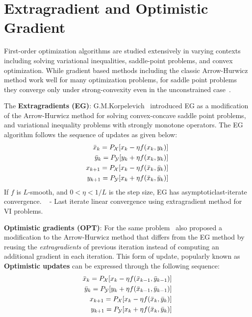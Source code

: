 \section{Extragradient and Optimistic Gradient}
First-order optimization algorithms are studied extensively in varying contexts including solving
variational inequalities, saddle-point problems, and convex optimization.
While gradient based methods including the classic Arrow-Hurwicz method work well for many
optimization problems, for saddle point problems they converge only under strong-convexity even in
the unconstrained case~\cite{heConvergence2022}.

The \textbf{Extragradients (EG)}: G.M.Korpelevich~\cite{korpelevichextragradient1976} introduced EG
as a modification of the Arrow-Hurwicz method for solving convex-concave saddle point problems, and
variational inequality problems with strongly monotone operators.
The EG algorithm follows the sequence of updates as given below:
\begin{equation}
	\label{eqn:eg}
	\begin{split}
		\bar{x}_{k} = P_{\mathcal{X}}[x_k - \eta f(x_k, y_k)] \\ \bar{y}_{k} = P_{\mathcal{Y}}[y_k + \eta
				f(x_k, y_k)] \\ x_{k+1} = P_{\mathcal{X}}[x_k - \eta f(\bar{x}_k, \bar{y}_k)] \\ y_{k+1} = P_{\mathcal{Y}}[x_k
				+ \eta f(\bar{x}_k, \bar{y}_k)]
	\end{split}
\end{equation} If $f$ is $L$-smooth, and $0 < \eta <
	1/L$ is the step size, EG has asymptoticlast-iterate convergence.
~\cite{tsenglinear1995} - Last iterate linear convergence using extragradient method for VI problems.

\textbf{Optimistic gradients (OPT)}: For the same problem~\cite{popovmodification1980} also proposed a modification to the Arrow-Hurwicz
method that differs from the EG method by reusing the \textit{extragradients} of previous iteration
instead of computing an additional gradient in each iteration.
This form of update, popularly known as \textbf{Optimistic updates} can be expressed through the
following sequence:
\begin{equation}
	\label{eqn:opt}
	\begin{split}
		\bar{x}_{k} = P_{\mathcal{X}}[x_k -
				\eta f(\bar{x}_{k-1}, \bar{y}_{k-1})] \\ \bar{y}_{k} = P_{\mathcal{Y}}[y_k + \eta f(\bar{x}_{k-1},
				\bar{y}_{k-1})] \\ x_{k+1} = P_{\mathcal{X}}[x_k - \eta f(\bar{x}_k, \bar{y}_k)] \\ y_{k+1} =
		P_{\mathcal{Y}}[x_k + \eta f(\bar{x}_k, \bar{y}_k)]
	\end{split}
\end{equation}

